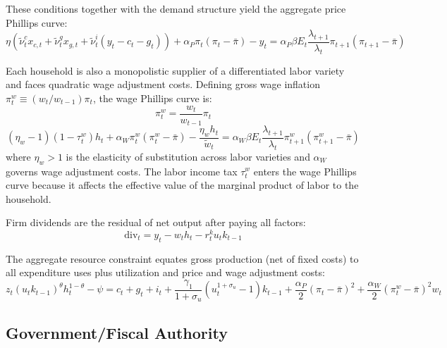 \documentclass[article,11pt,letterpaper,fleqn]{article}
\theoremstyle{definition}
\numberwithin{equation}{section}
\begin{document}
These conditions together with the demand structure yield the aggregate price Phillips curve:
\begin{equation}\label{eq:pricePC}
\eta\!\left(\tilde{\nu}_t^c x_{c,t} + \tilde{\nu}_t^g x_{g,t} + \tilde{\nu}_t^i(y_t - c_t - g_t)\right) + \alpha_P\pi_t(\pi_t - \bar{\pi}) - y_t = \alpha_P\beta E_t\frac{\lambda_{t+1}}{\lambda_t}\pi_{t+1}(\pi_{t+1}-\bar{\pi})
\end{equation}

Each household is also a monopolistic supplier of a differentiated labor variety and faces quadratic wage adjustment costs. Defining gross wage inflation $\pi_t^w \equiv (w_t / w_{t-1})\pi_t$, the wage Phillips curve is:
\begin{equation}\label{eq:wageinfl}
\pi_t^w = \frac{w_t}{w_{t-1}}\pi_t
\end{equation}
\begin{equation}\label{eq:wagePC}
(\eta_w - 1)(1-\tau_t^w)h_t + \alpha_W\pi_t^w(\pi_t^w - \bar{\pi}) - \frac{\eta_w h_t}{\tilde{w}_t} = \alpha_W\beta E_t\frac{\lambda_{t+1}}{\lambda_t}\pi_{t+1}^w(\pi_{t+1}^w - \bar{\pi})
\end{equation}
where $\eta_w > 1$ is the elasticity of substitution across labor varieties and $\alpha_W$ governs wage adjustment costs. The labor income tax $\tau_t^w$ enters the wage Phillips curve because it affects the effective value of the marginal product of labor to the household.

Firm dividends are the residual of net output after paying all factors:
\begin{equation}\label{eq:div}
\text{div}_t = y_t - w_t h_t - r_t^k u_t k_{t-1}
\end{equation}

The aggregate resource constraint equates gross production (net of fixed costs) to all expenditure uses plus utilization and price and wage adjustment costs:
\begin{equation}\label{eq:rc}
z_t(u_t k_{t-1})^{\theta}h_t^{1-\theta} - \psi = c_t + g_t + i_t + \frac{\gamma_1}{1+\sigma_u}(u_t^{1+\sigma_u}-1)k_{t-1} + \frac{\alpha_P}{2}(\pi_t-\bar{\pi})^2 + \frac{\alpha_W}{2}(\pi_t^w-\bar{\pi})^2 w_t
\end{equation}


\subsection{Government/Fiscal Authority}
\label{sec:govt}
\end{document}
